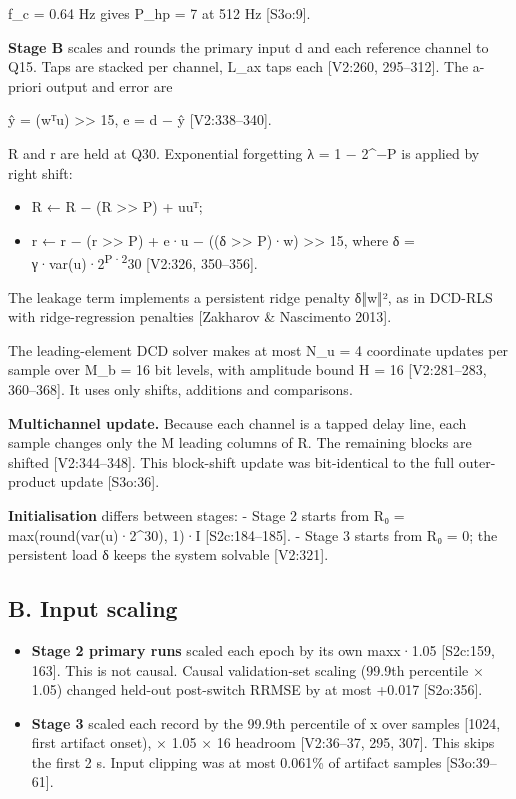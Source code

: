 \documentclass[
  9pt,
]{article}
\providecommand{\tightlist}{%
  \setlength{\itemsep}{0pt}\setlength{\parskip}{0pt}}
\begin{document}
f\_c = 0.64 Hz gives P\_hp = 7 at 512 Hz {[}S3o:9{]}.

\textbf{Stage B} scales and rounds the primary input d and each
reference channel to Q15. Taps are stacked per channel, L\_ax taps each
{[}V2:260, 295--312{]}. The a-priori output and error are

ŷ = (wᵀu) \textgreater\textgreater{} 15, e = d − ŷ {[}V2:338--340{]}.

R and r are held at Q30. Exponential forgetting λ = 1 − 2\^{}−P is
applied by right shift:

\begin{itemize}
\tightlist
\item
  R ← R − (R \textgreater\textgreater{} P) + uuᵀ;
\item
  r ← r − (r \textgreater\textgreater{} P) + e·u − ((δ
  \textgreater\textgreater{} P)·w) \textgreater\textgreater{} 15, where
  δ = γ·var(u)·2\textsuperscript{P·2}30 {[}V2:326, 350--356{]}.
\end{itemize}

The leakage term implements a persistent ridge penalty δ‖w‖², as in
DCD-RLS with ridge-regression penalties {[}Zakharov \& Nascimento
2013{]}.

The leading-element DCD solver makes at most N\_u = 4 coordinate updates
per sample over M\_b = 16 bit levels, with amplitude bound H = 16
{[}V2:281--283, 360--368{]}. It uses only shifts, additions and
comparisons.

\textbf{Multichannel update.} Because each channel is a tapped delay
line, each sample changes only the M leading columns of R. The remaining
blocks are shifted {[}V2:344--348{]}. This block-shift update was
bit-identical to the full outer-product update {[}S3o:36{]}.

\textbf{Initialisation} differs between stages: - Stage 2 starts from R₀
= max(round(var(u)·2\^{}30), 1)·I {[}S2c:184--185{]}. - Stage 3 starts
from R₀ = 0; the persistent load δ keeps the system solvable
{[}V2:321{]}.

\hypertarget{b.-input-scaling}{%
\subsection{B. Input scaling}\label{b.-input-scaling}}

\begin{itemize}
\tightlist
\item
  \textbf{Stage 2 primary runs} scaled each epoch by its own
  max\textbar x\textbar·1.05 {[}S2c:159, 163{]}. This is not causal.
  Causal validation-set scaling (99.9th percentile × 1.05) changed
  held-out post-switch RRMSE by at most +0.017 {[}S2o:356{]}.
\item
  \textbf{Stage 3} scaled each record by the 99.9th percentile of
  \textbar x\textbar{} over samples {[}1024, first artifact onset), ×
  1.05 × 16 headroom {[}V2:36--37, 295, 307{]}. This skips the first 2
  s. Input clipping was at most 0.061\% of artifact samples
  {[}S3o:39--61{]}.
\end{itemize}
\end{document}
